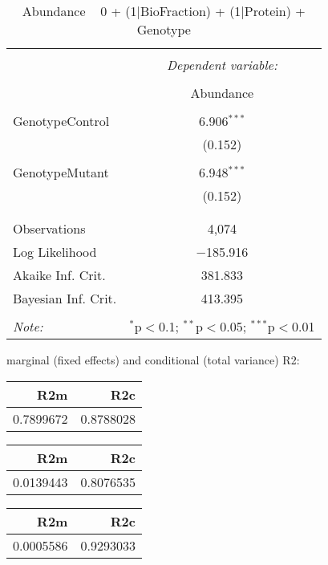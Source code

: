 \documentclass[11pt]{report}
\begin{document}
\begin{table}[!htbp] \centering 
  \caption{Abundance ~ 0 + (1|BioFraction) + (1|Protein) + Genotype} 
  \label{} 
\begin{tabular}{@{\extracolsep{5pt}}lc} 
\\[-1.8ex]\hline 
\hline \\[-1.8ex] 
 & \multicolumn{1}{c}{\textit{Dependent variable:}} \\ 
\cline{2-2} 
\\[-1.8ex] & Abundance \\ 
\hline \\[-1.8ex] 
 GenotypeControl & 6.906$^{***}$ \\ 
  & (0.152) \\ 
  & \\ 
 GenotypeMutant & 6.948$^{***}$ \\ 
  & (0.152) \\ 
  & \\ 
\hline \\[-1.8ex] 
Observations & 4,074 \\ 
Log Likelihood & $-$185.916 \\ 
Akaike Inf. Crit. & 381.833 \\ 
Bayesian Inf. Crit. & 413.395 \\ 
\hline 
\hline \\[-1.8ex] 
\textit{Note:}  & \multicolumn{1}{r}{$^{*}$p$<$0.1; $^{**}$p$<$0.05; $^{***}$p$<$0.01} \\ 
\end{tabular} 
\end{table} 
marginal (fixed effects) and conditional (total variance) R2:

\begin{tabular}{r|r}
\hline
R2m & R2c\\
\hline
0.7899672 & 0.8788028\\
\hline
\end{tabular}

\begin{tabular}{r|r}
\hline
R2m & R2c\\
\hline
0.0139443 & 0.8076535\\
\hline
\end{tabular}

\begin{tabular}{r|r}
\hline
R2m & R2c\\
\hline
0.0005586 & 0.9293033\\
\hline
\end{tabular}
\end{document}
